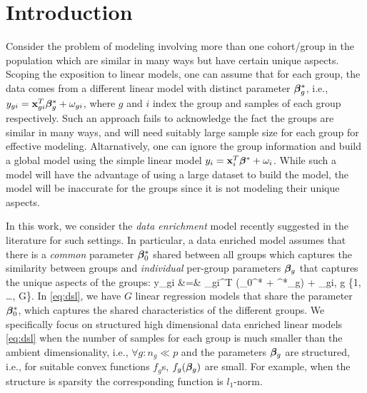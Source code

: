 
\section{Introduction}
Consider the problem of modeling involving more than one cohort/group in the population which are similar in many ways but have certain unique aspects. Scoping the exposition to linear models,
one can assume that for each group, the data comes from a different linear model with distinct parameter $\boldsymbol{\beta}^*_g$, i.e., $y_{gi} = \mathbf{x}_{gi}^T \boldsymbol{\beta}_g^* + \omega_{gi}$, where $g$ and $i$ index the group and samples of each group respectively. Such an approach fails to acknowledge the fact the groups are similar in many ways, and will need suitably large sample size for each group for effective modeling. 
Altarnatively, one can ignore the group information and build a global model using the simple linear model $y_i = \mathbf{x}_i^T \boldsymbol{\beta}^* + \omega_i$. While such a model will have the advantage of using a large dataset to build the model, the model will be inaccurate for the groups since it is not modeling their unique aspects.

In this work, we consider the {\em data enrichment} model recently suggested in the literature \cite{domu16, grti16,  olvi14, olvi15} for such settings. In particular, a data enriched model assumes that there is a \emph{common} parameter $\boldsymbol{\beta}^*_0$ shared between all groups which captures the similarity between groups and \emph{individual} per-group parameters $\boldsymbol{\beta}_g$ that captures the unique aspects of the groups:
\be
\label{eq:dsl}
y_{gi} &=& \x_{gi}^T (\bbeta_0^* + \bbeta^*_g) + \omega_{gi}, \quad g \in \{1, \dots, G\}.
\ee
In \eqref{eq:dsl}, we have $G$ linear regression models that share the parameter $\boldsymbol{\beta}_0^*$, which captures the shared characteristics of the different groups. 
We specifically focus on structured high dimensional data enriched linear models  \eqref{eq:dsl} when the number of samples for each group is much smaller than the ambient dimensionality, i.e., $\forall g: n_g \ll p$ and the
parameters $\boldsymbol{\beta}_g$ are structured, i.e., for suitable convex functions $f_g$s, $f_g(\boldsymbol{\beta}_g)$ are small.
For example, when the structure is sparsity the corresponding function is $l_1$-norm.

